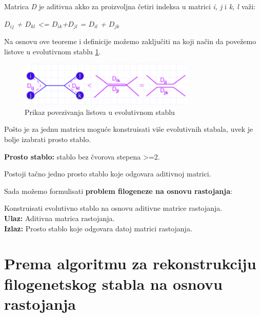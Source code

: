 \begin{teorema}
Matrica \textit{D} je aditivna akko za proizvoljna \v{c}etiri indeksa u matrici \textit{i, j} i \textit{k, l} va\v{z}i:

\begin{center}
\textit{$D_{ij}$ + $D_{kl}$ \textless= $D_{ik}$+$D_{jl}$ = $D_{il}$ + $D_{jk}$}
\end{center}

\end{teorema}

Na osnovu ove teoreme i definicije mo\v{z}emo zaklju\v{c}iti na koji na\v{c}in da pove\v{z}emo listove u evolutivnom stablu \ref{fig:pples}.

\begin{figure}[h!]
\begin{center}
\includegraphics[width=0.75\textwidth]{poglavlja/7/slike/slika4.png}
\end{center}
\caption{Prikaz povezivanja listova u evolutivnom stablu}
\label{fig:pples}
\end{figure}

Po\v{s}to je za jednu matricu mogu\'ce konstruisati vi\v{s}e evolutivnih stabala, uvek je bolje izabrati prosto stablo. 

\begin{definicija}
\textbf{Prosto stablo:} stablo bez \v{c}vorova stepena \textgreater=2.
\end{definicija}

\begin{teorema}
Postoji ta\v{c}no jedno prosto stablo koje odgovara aditivnoj matrici.
\end{teorema}

Sada mo\v{z}emo formulisati \textbf{problem filogeneze na osnovu rastojanja}:

\begin{tcolorbox}
Konstruisati evolutivno stablo na osnovu aditivne matrice rastojanja. \\
\textbf{Ulaz:} Aditivna matrica rastojanja.\\
\textbf{Izlaz:} Prosto stablo koje odgovara datoj matrici rastojanja.
\end{tcolorbox}

\section{Prema algoritmu za rekonstrukciju filogenetskog stabla na osnovu rastojanja}
\label{pazrfsnor}

